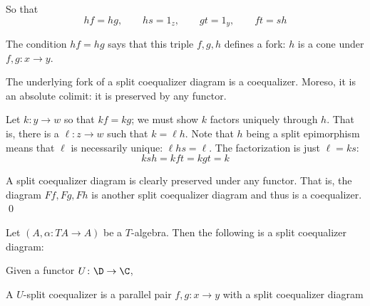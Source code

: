     So that
    $$ hf=hg,\qquad hs=1_z,\qquad gt=1_y,\qquad ft=sh $$

\edefn

The condition $hf=hg$ says that this triple $f,g,h$ defines a {\emphcolor fork}: $h$ is a cone under $f,g\colon x\to y$.

\blemm

    The underlying fork of a split coequalizer diagram is a coequalizer.
    Moreso, it is an {\emphcolor absolute colimit}: it is preserved by any functor.

\elemm

\bproof

    Let $k\colon y\to w$ so that $kf=kg$; we must show $k$ factors uniquely through $h$.
    That is, there is a $\ell\colon z\to w$ such that $k=\ell h$.
    Note that $h$ being a split epimorphism means that $\ell$ is necessarily unique: $\ell hs=\ell$.
    The factorization is just $\ell=ks$:
    $$ ksh = kft = kgt = k $$

    A split coequalizer diagram is clearly preserved under any functor.
    That is, the diagram $Ff,Fg,Fh$ is another split coequalizer diagram and thus is a coequalizer.
    \qed

\eproof

\bexam

    Let $(A,\alpha\colon TA\to A)$ be a $T$-algebra.
    Then the following is a split coequalizer diagram:

    \medskip
    \centerline{}
    \bigskip

\eexam

\bdefn

    Given a functor $U\colon\D\to\C$,

    \benum
        \item A {\emphcolor $U$-split coequalizer} is a parallel pair $f,g\colon x\to y$ with a split coequalizer diagram

        \medskip
        \centerline{}
        \bigskip

